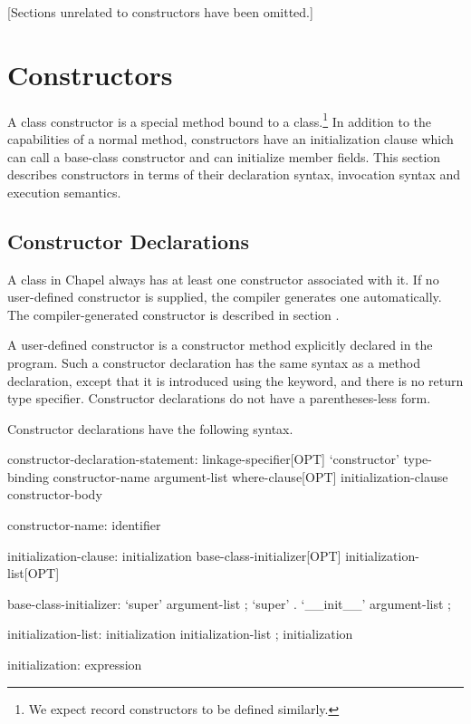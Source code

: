 \label{Classes}

[Sections unrelated to constructors have been omitted.]

\section{Constructors}
\label{Constructors}

A class constructor is a special method bound to a class.\footnote{We expect
record constructors to be defined similarly.}  In addition to
the capabilities of a normal method, constructors have an initialization clause
which can call a base-class constructor and can initialize member fields.  This
section describes constructors in terms of their declaration syntax, invocation
syntax and execution semantics.  

\subsection{Constructor Declarations}
\label{Constructor_Declarations}

A class in Chapel always has at least one constructor associated with it.  If no
user-defined constructor is supplied, the compiler generates one automatically.
The compiler-generated constructor is described in section .

A user-defined constructor is a constructor method explicitly declared
in the program.  Such a constructor declaration has the same
syntax as a method declaration, except that it is introduced using
the  keyword, and there is no return type specifier.
Constructor declarations do not have a parentheses-less form.

Constructor declarations have the following syntax.
\begin{syntax}
constructor-declaration-statement:
  linkage-specifier[OPT] `constructor' type-binding constructor-name argument-list 
    where-clause[OPT] initialization-clause constructor-body

constructor-name:
  identifier

initialization-clause:
  initialization
  { base-class-initializer[OPT] initialization-list[OPT] }

base-class-initializer:
  `super' argument-list ;
  `super' . `__init__' argument-list ;

initialization-list:
  initialization
  initialization-list ; initialization

initialization:
  expression

\end{syntax}

